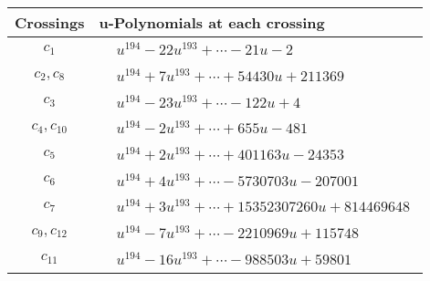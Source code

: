 \documentclass[1p]{elsarticle_modified}
\theoremstyle{definition}
\begin{document}
\begin{tabular}{m{50pt}|m{274pt}}
Crossings & \hspace{64pt}u-Polynomials at each crossing \\
\hline $$\begin{aligned}c_{1}\end{aligned}$$&$\begin{aligned}
&u^{194}-22 u^{193}+\cdots-21 u-2
\end{aligned}$\\
\hline $$\begin{aligned}c_{2},c_{8}\end{aligned}$$&$\begin{aligned}
&u^{194}+7 u^{193}+\cdots+54430 u+211369
\end{aligned}$\\
\hline $$\begin{aligned}c_{3}\end{aligned}$$&$\begin{aligned}
&u^{194}-23 u^{193}+\cdots-122 u+4
\end{aligned}$\\
\hline $$\begin{aligned}c_{4},c_{10}\end{aligned}$$&$\begin{aligned}
&u^{194}-2 u^{193}+\cdots+655 u-481
\end{aligned}$\\
\hline $$\begin{aligned}c_{5}\end{aligned}$$&$\begin{aligned}
&u^{194}+2 u^{193}+\cdots+401163 u-24353
\end{aligned}$\\
\hline $$\begin{aligned}c_{6}\end{aligned}$$&$\begin{aligned}
&u^{194}+4 u^{193}+\cdots-5730703 u-207001
\end{aligned}$\\
\hline $$\begin{aligned}c_{7}\end{aligned}$$&$\begin{aligned}
&u^{194}+3 u^{193}+\cdots+15352307260 u+814469648
\end{aligned}$\\
\hline $$\begin{aligned}c_{9},c_{12}\end{aligned}$$&$\begin{aligned}
&u^{194}-7 u^{193}+\cdots-2210969 u+115748
\end{aligned}$\\
\hline $$\begin{aligned}c_{11}\end{aligned}$$&$\begin{aligned}
&u^{194}-16 u^{193}+\cdots-988503 u+59801
\end{aligned}$\\
\hline
\end{tabular}\\~\\
\end{document}
